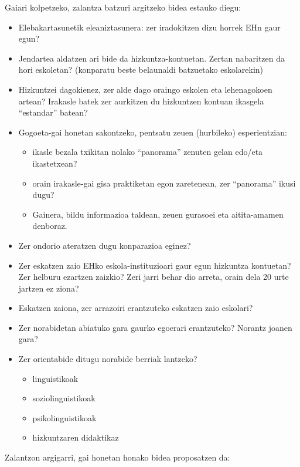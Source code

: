 \documentclass[
]{book}
\providecommand{\tightlist}{%
  \setlength{\itemsep}{0pt}\setlength{\parskip}{0pt}}
\begin{document}
Gaiari kolpetzeko, zalantza batzuri argitzeko bidea estauko diegu:

\begin{itemize}
\tightlist
\item
  Elebakartasunetik eleaniztasunera: zer iradokitzen dizu horrek EHn gaur egun?
\item
  Jendartea aldatzen ari bide da hizkuntza-kontuetan. Zertan nabaritzen da hori eskoletan? (konparatu beste belaunaldi batzuetako eskolarekin)
\item
  Hizkuntzei dagokienez, zer alde dago oraingo eskolen eta lehenagokoen artean? Irakasle batek zer aurkitzen du hizkuntzen kontuan ikasgela ``estandar'' batean?
\item
  Gogoeta-gai honetan sakontzeko, pentsatu zeuen (hurbileko) esperientzian:

  \begin{itemize}
  \tightlist
  \item
    ikasle bezala txikitan nolako ``panorama'' zenuten gelan edo/eta ikastetxean?
  \item
    orain irakasle-gai gisa praktiketan egon zaretenean, zer ``panorama'' ikusi dugu?
  \item
    Gainera, bildu informazioa taldean, zeuen gurasoei eta aitita-amamen denboraz.
  \end{itemize}
\item
  Zer ondorio ateratzen dugu konparazioa eginez?
\item
  Zer eskatzen zaio EHko eskola-instituzioari gaur egun hizkuntza kontuetan? Zer helburu ezartzen zaizkio? Zeri jarri behar dio arreta, orain dela 20 urte jartzen ez ziona?
\item
  Eskatzen zaiona, zer arrazoiri erantzuteko eskatzen zaio eskolari?
\item
  Zer norabidetan abiatuko gara gaurko egoerari erantzuteko? Norantz joanen gara?
\item
  Zer orientabide ditugu norabide berriak lantzeko?

  \begin{itemize}
  \tightlist
  \item
    linguistikoak
  \item
    soziolinguistikoak
  \item
    psikolinguistikoak
  \item
    hizkuntzaren didaktikaz
  \end{itemize}
\end{itemize}

Zalantzon argigarri, gai honetan honako bidea proposatzen da:
\end{document}

